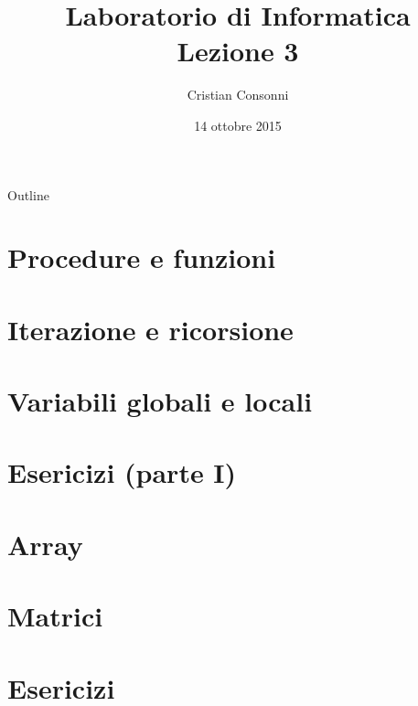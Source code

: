 \documentclass[10pt]{beamer}
\title[Laboratorio di Informatica - Lezione 3]{Laboratorio di Informatica \\ Lezione 3}
\author[Cristian Consonni]{Cristian Consonni}
\date[14/10/2015]{14 ottobre 2015}
\institute[UniTN]{Università degli Studi di Trento}
\begin{document}
\begin{frame}
  \titlepage
\end{frame}

\begin{frame}{Outline}
  \tableofcontents
\end{frame}



\section{Procedure e funzioni}


\section{Iterazione e ricorsione}


\section{Variabili globali e locali}


\section{Esericizi (parte I)}


\section{Array}


\section{Matrici}


\section{Esericizi}



% 
\end{document}
